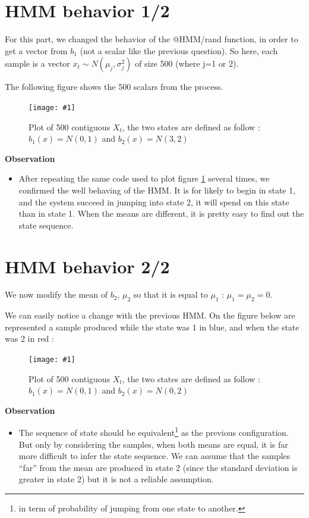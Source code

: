 \documentclass[a4paper]{report}
\newcommand{\img}[3]{\begin{figure}[!h] \centering \texttt{[image: \#1]}\captionsetup{justification=centering} \caption{#3} \label{#1} \end{figure}}
\newenvironment{pushright}[1]{\textbf{#1}
\begin{itemize}\item[\hspace{12pt}]}{\end{itemize}
}
\begin{document}
\section{HMM behavior 1/2}
For this part, we changed the behavior of the @HMM/rand function, in order to get a vector from $b_{1}$ (not a scalar like the previous question). So here, each sample is a vector $x_{t} \sim N(\mu_j,\sigma_j^2)$ of size 500 (where j=1 or 2).

The following figure shows the 500 scalars from the process.


\img{etude_hmmrand}{0.4}{Plot of 500 contiguous $X_t$, the two states are defined as follow : $b_1(x) = N(0,1)$ and $b_2(x) = N(3,2)$}
\begin{pushright}{Observation}
After repeating the same code used to plot figure \ref{etude_hmmrand} several times, we confirmed the well behaving of the HMM. It is for likely to begin in state 1, and the system succeed in jumping into state 2, it will spend on this state than in state 1. When the means are different, it is pretty easy to find out the state sequence.
\end{pushright}
\pagebreak
\section{HMM behavior 2/2}
We now modify the mean of $b_{2}$, $\mu_{2}$ so that it is equal to $\mu_{1}$ : $\mu_{1}=\mu_{2}=0$.

We can easily notice a change with the previous HMM. On the figure below are represented a sample produced while the state was 1 in blue, and when the state was 2 in red :

\img{hmm_same_mean}{0.4}{Plot of 500 contiguous $X_t$, the two states are defined as follow : $b_1(x) = N(0,1)$ and $b_2(x) = N(0,2)$}
\begin{pushright}{Observation}
The sequence of state should be equivalent\footnote{ in term of probability of jumping from one state to another.} as the previous configuration. But only by considering the samples, when both means are equal, it is far more difficult to infer the state sequence. We can assume that the samples ``far'' from the mean are produced in state 2 (since the standard deviation is greater in state 2) but it is not a reliable assumption. 
\end{pushright}
\end{document}
